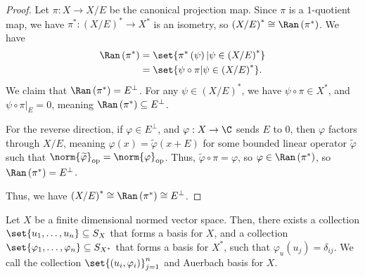 \documentclass[10pt]{mypackage}
\begin{document}
\begin{proof}
  Let $\pi: X\rightarrow X/E$ be the canonical projection map. Since $\pi$ is a $1$-quotient map, we have $\pi^{\ast}:\left(X/E\right)^{\ast}\rightarrow X^{\ast}$ is an isometry, so $\left(X/E\right)^{\ast} \cong \Ran\left(\pi^{\ast}\right)$. We have
  \begin{align*}
    \Ran\left(\pi^{\ast}\right) &= \set{\pi^{\ast}\left(\psi\right)| \psi\in \left(X/E\right)^{\ast}}\\
                                &= \set{\psi\circ \pi| \psi\in \left(X/E\right)^{\ast}}.
  \end{align*}
  We claim that $\Ran\left(\pi^{\ast}\right) = E^{\perp}$. For any $\psi\in \left(X/E\right)^{\ast}$, we have $\psi\circ \pi\in X^{\ast}$, and $\psi\circ \pi|_{E} = 0$, meaning $\Ran\left(\pi^{\ast}\right) \subseteq E^{\perp}$.\newline

  For the reverse direction, if $\varphi\in E^{\perp}$, and $\varphi: X\rightarrow \C$ sends $E$ to $0$, then $\varphi$ factors through $X/E$, meaning $\varphi(x) = \widetilde{\varphi}\left(x+E\right)$ for some bounded linear operator $\widetilde{\varphi}$ such that $\norm{\widetilde{\varphi}}_{\text{op}} = \norm{\varphi}_{\text{op}}$. Thus, $\widetilde{\varphi}\circ \pi = \varphi$, so $\varphi\in \Ran\left(\pi^{\ast}\right)$, so $\Ran\left(\pi^{\ast}\right) = E^{\perp}$.\newline

  Thus, we have $\left(X/E\right)^{\ast} \cong \Ran\left(\pi^{\ast}\right) \cong E^{\perp}$.
\end{proof}
\begin{proposition}
  Let $X$ be a finite dimensional normed vector space. Then, there exists a collection $\set{u_1,\dots,u_n}\subseteq S_X$ that forms a basis for $X$, and a collection $\set{\varphi_1,\dots,\varphi_n}\subseteq S_{X^{\ast}}$ that forms a basis for $X^{\ast}$, such that $\varphi_u\left(u_j\right) = \delta_{ij}$. We call the collection $\set{\left(u_i,\varphi_i\right)}_{j=1}^{n}$ and Auerbach basis for $X$.
\end{proposition}
\end{document}
